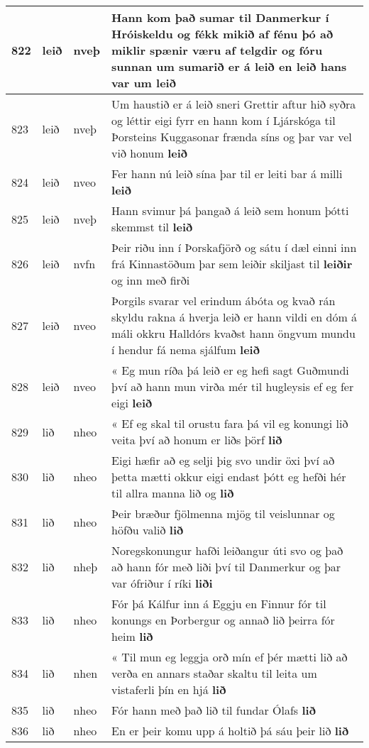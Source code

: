\documentclass{article}
\begin{document}
\begin{longtable}{p{1cm}|p{1cm}|p{1cm}|p{13cm}}
822&leið&nveþ&Hann kom það sumar til Danmerkur í Hróiskeldu og fékk mikið af fénu þó að miklir spænir væru af telgdir og fóru sunnan um sumarið er á leið en leið hans var um \textbf{leið} \\
\hline
823&leið&nveþ&Um haustið er á leið sneri Grettir aftur hið syðra og léttir eigi fyrr en hann kom í Ljárskóga til Þorsteins Kuggasonar frænda síns og þar var vel við honum \textbf{leið} \\
\hline
824&leið&nveo&Fer hann nú leið sína þar til er leiti bar á milli \textbf{leið} \\
\hline
825&leið&nveþ&Hann svimur þá þangað á leið sem honum þótti skemmst til \textbf{leið} \\
\hline
826&leið&nvfn&Þeir riðu inn í Þorskafjörð og sátu í dæl einni inn frá Kinnastöðum þar sem leiðir skiljast til \textbf{leiðir} og inn með firði\\
\hline
827&leið&nveo&Þorgils svarar vel erindum ábóta og kvað rán skyldu rakna á hverja leið er hann vildi en dóm á máli okkru Halldórs kvaðst hann öngvum mundu í hendur fá nema sjálfum \textbf{leið} \\
\hline
828&leið&nveo&« Eg mun ríða þá leið er eg hefi sagt Guðmundi því að hann mun virða mér til hugleysis ef eg fer eigi \textbf{leið} \\
\hline
829&lið&nheo&« Ef eg skal til orustu fara þá vil eg konungi lið veita því að honum er liðs þörf \textbf{lið} \\
\hline
830&lið&nheo&Eigi hæfir að eg selji þig svo undir öxi því að þetta mætti okkur eigi endast þótt eg hefði hér til allra manna lið og \textbf{lið} \\
\hline
831&lið&nheo&Þeir bræður fjölmenna mjög til veislunnar og höfðu valið \textbf{lið} \\
\hline
832&lið&nheþ&Noregskonungur hafði leiðangur úti svo og það að hann fór með liði því til Danmerkur og þar var ófriður í ríki \textbf{liði} \\
\hline
833&lið&nheo&Fór þá Kálfur inn á Eggju en Finnur fór til konungs en Þorbergur og annað lið þeirra fór heim \textbf{lið} \\
\hline
834&lið&nhen&« Til mun eg leggja orð mín ef þér mætti lið að verða en annars staðar skaltu til leita um vistaferli þín en hjá \textbf{lið} \\
\hline
835&lið&nheo&Fór hann með það lið til fundar Ólafs \textbf{lið} \\
\hline
836&lið&nheo&En er þeir komu upp á holtið þá sáu þeir lið \textbf{lið} \\

\end{longtable}
\end{document}
